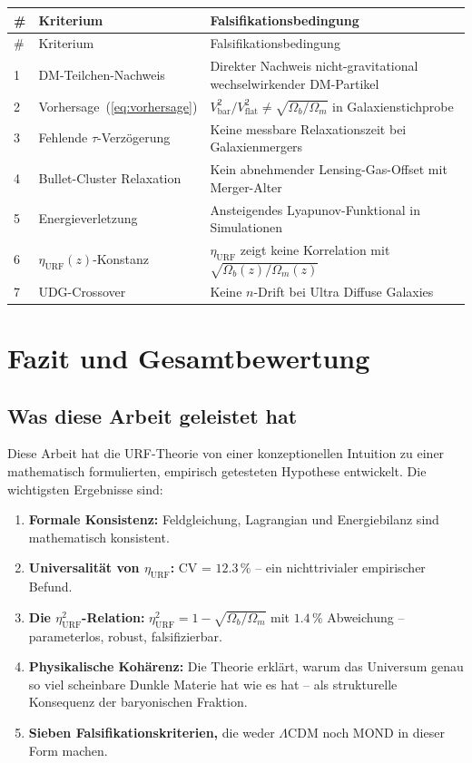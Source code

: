 \documentclass[12pt,a4paper]{article}
\theoremstyle{definition}
\begin{document}
\begin{center}
\begin{longtable}{p{0.5cm}p{4cm}p{8cm}}
\toprule
\# & Kriterium & Falsifikationsbedingung \\
\midrule
\endfirsthead
\toprule
\# & Kriterium & Falsifikationsbedingung \\
\midrule
\endhead
1 & DM-Teilchen-Nachweis & Direkter Nachweis nicht-gravitational wechselwirkender DM-Partikel \\
2 & Vorhersage~(\ref{eq:vorhersage}) & $V_{\mathrm{bar}}^2/V_{\mathrm{flat}}^2 \neq \sqrt{\Omega_b/\Omega_m}$ in Galaxienstichprobe \\
3 & Fehlende $\tau$-Verzögerung & Keine messbare Relaxationszeit bei Galaxienmergers \\
4 & Bullet-Cluster Relaxation & Kein abnehmender Lensing-Gas-Offset mit Merger-Alter \\
5 & Energieverletzung & Ansteigendes Lyapunov-Funktional in Simulationen \\
6 & $\eta_{\mathrm{URF}}(z)$-Konstanz & $\eta_{\mathrm{URF}}$ zeigt keine Korrelation mit $\sqrt{\Omega_b(z)/\Omega_m(z)}$ \\
7 & UDG-Crossover & Keine $n$-Drift bei Ultra Diffuse Galaxies \\
\bottomrule
\end{longtable}
\end{center}

\section{Fazit und Gesamtbewertung}
\label{sec:fazit}

\subsection{Was diese Arbeit geleistet hat}

Diese Arbeit hat die URF-Theorie von einer konzeptionellen Intuition
zu einer mathematisch formulierten, empirisch getesteten Hypothese
entwickelt. Die wichtigsten Ergebnisse sind:
\begin{enumerate}
\item \textbf{Formale Konsistenz:} Feldgleichung, Lagrangian und
Energiebilanz sind mathematisch konsistent.
\item \textbf{Universalität von $\eta_{\mathrm{URF}}$:} CV = $12.3\,\%$ --
ein nichttrivialer empirischer Befund.
\item \textbf{Die $\eta_{\mathrm{URF}}^2$-Relation:}
$\eta_{\mathrm{URF}}^2 = 1 - \sqrt{\Omega_b/\Omega_m}$ mit $1.4\,\%$ Abweichung --
parameterlos, robust, falsifizierbar.
\item \textbf{Physikalische Kohärenz:} Die Theorie erklärt, warum
das Universum genau so viel scheinbare Dunkle Materie hat wie es hat --
als strukturelle Konsequenz der baryonischen Fraktion.
\item \textbf{Sieben Falsifikationskriterien,} die weder $\Lambda$CDM
noch MOND in dieser Form machen.
\end{enumerate}
\end{document}
